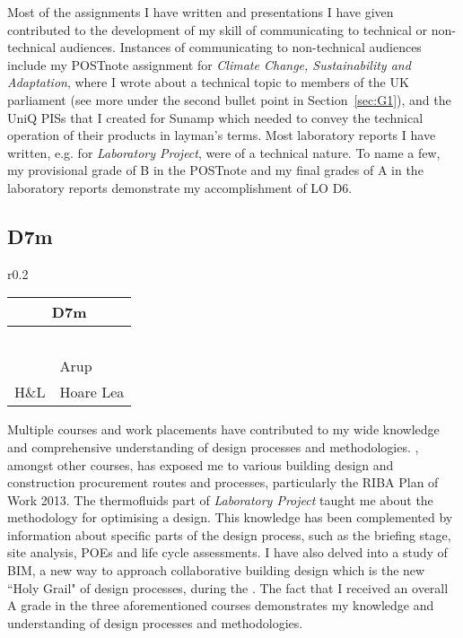 Most of the assignments I have written and presentations I have given contributed to the development of my skill of communicating to technical or non-technical audiences.
Instances of communicating to non-technical audiences include my POSTnote assignment for \textit{Climate Change, Sustainability and Adaptation}, where I wrote about a technical topic to members of the UK parliament (see more under the second bullet point in Section~\ref{sec:G1}), and the UniQ PISs that I created for Sunamp which needed to convey the technical operation of their products in layman's terms.
Most laboratory reports I have written, e.g. for \textit{Laboratory Project}, were of a technical nature.
To name a few, my provisional grade of B in the POSTnote and my final grades of A in the laboratory reports demonstrate my accomplishment of LO D6.







\subsection*{D7m}

\begin{wraptable}[9]{r}{0.2\textwidth}
	\begin{tabular}{|ll|}
		\hline
		\multicolumn{2}{|c|}{\cellcolor[HTML]{F8A102}\textbf{D7m \nomaster}} \\ \hline
		\ConTechOne & \ID \\
		\EnvBeh & \CAS \\
		\PC & \FMP \\
		\PRJ & \DST \\
		\LAB & \SIB \\
		\ICP & Arup \\
		H{\&}L & Hoare Lea \\ \hline
	\end{tabular}
\end{wraptable}

Multiple courses and work placements have contributed to my wide knowledge and comprehensive understanding of design processes and methodologies.
\PC, amongst other courses, has exposed me to various building design and construction procurement routes and processes, particularly the RIBA Plan of Work 2013.
The thermofluids part of \textit{Laboratory Project} taught me about the methodology for optimising a design.
This knowledge has been complemented by information about specific parts of the design process, such as the briefing stage, site analysis, POEs and life cycle assessments.
I have also delved into a study of BIM, a new way to approach collaborative building design which is the new ``Holy Grail" of design processes, during the \DSTTitle.
The fact that I received an overall A grade in the three aforementioned courses demonstrates my knowledge and understanding of design processes and methodologies.

